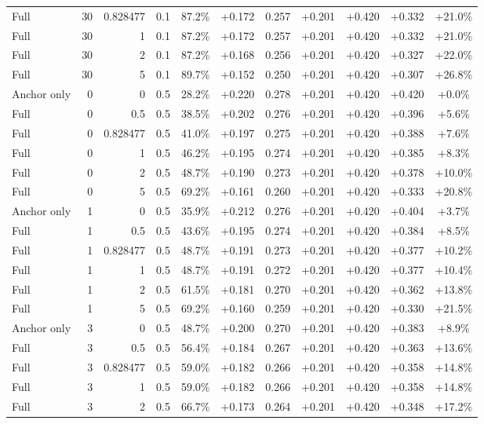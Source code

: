 \begin{table}[htbp]
\begin{tabular}{lrrrccccccc}
Full & 30 & 0.828477 & 0.1 & 87.2\% & +0.172 & 0.257 & +0.201 & +0.420 & +0.332 & +21.0\% \\
Full & 30 & 1 & 0.1 & 87.2\% & +0.172 & 0.257 & +0.201 & +0.420 & +0.332 & +21.0\% \\
Full & 30 & 2 & 0.1 & 87.2\% & +0.168 & 0.256 & +0.201 & +0.420 & +0.327 & +22.0\% \\
Full & 30 & 5 & 0.1 & 89.7\% & +0.152 & 0.250 & +0.201 & +0.420 & +0.307 & +26.8\% \\
Anchor only & 0 & 0 & 0.5 & 28.2\% & +0.220 & 0.278 & +0.201 & +0.420 & +0.420 & +0.0\% \\
Full & 0 & 0.5 & 0.5 & 38.5\% & +0.202 & 0.276 & +0.201 & +0.420 & +0.396 & +5.6\% \\
Full & 0 & 0.828477 & 0.5 & 41.0\% & +0.197 & 0.275 & +0.201 & +0.420 & +0.388 & +7.6\% \\
Full & 0 & 1 & 0.5 & 46.2\% & +0.195 & 0.274 & +0.201 & +0.420 & +0.385 & +8.3\% \\
Full & 0 & 2 & 0.5 & 48.7\% & +0.190 & 0.273 & +0.201 & +0.420 & +0.378 & +10.0\% \\
Full & 0 & 5 & 0.5 & 69.2\% & +0.161 & 0.260 & +0.201 & +0.420 & +0.333 & +20.8\% \\
Anchor only & 1 & 0 & 0.5 & 35.9\% & +0.212 & 0.276 & +0.201 & +0.420 & +0.404 & +3.7\% \\
Full & 1 & 0.5 & 0.5 & 43.6\% & +0.195 & 0.274 & +0.201 & +0.420 & +0.384 & +8.5\% \\
Full & 1 & 0.828477 & 0.5 & 48.7\% & +0.191 & 0.273 & +0.201 & +0.420 & +0.377 & +10.2\% \\
Full & 1 & 1 & 0.5 & 48.7\% & +0.191 & 0.272 & +0.201 & +0.420 & +0.377 & +10.4\% \\
Full & 1 & 2 & 0.5 & 61.5\% & +0.181 & 0.270 & +0.201 & +0.420 & +0.362 & +13.8\% \\
Full & 1 & 5 & 0.5 & 69.2\% & +0.160 & 0.259 & +0.201 & +0.420 & +0.330 & +21.5\% \\
Anchor only & 3 & 0 & 0.5 & 48.7\% & +0.200 & 0.270 & +0.201 & +0.420 & +0.383 & +8.9\% \\
Full & 3 & 0.5 & 0.5 & 56.4\% & +0.184 & 0.267 & +0.201 & +0.420 & +0.363 & +13.6\% \\
Full & 3 & 0.828477 & 0.5 & 59.0\% & +0.182 & 0.266 & +0.201 & +0.420 & +0.358 & +14.8\% \\
Full & 3 & 1 & 0.5 & 59.0\% & +0.182 & 0.266 & +0.201 & +0.420 & +0.358 & +14.8\% \\
Full & 3 & 2 & 0.5 & 66.7\% & +0.173 & 0.264 & +0.201 & +0.420 & +0.348 & +17.2\% \\

\end{tabular}
\end{table}

